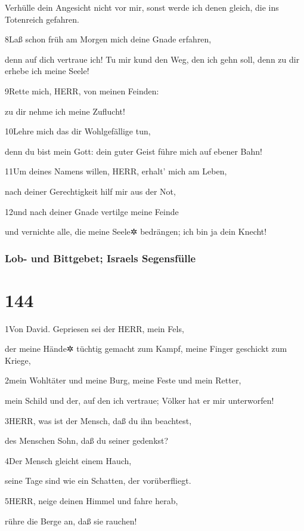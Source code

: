 Verhülle dein Angesicht nicht vor mir, sonst werde ich denen gleich, die
ins Totenreich gefahren.

8Laß schon früh am Morgen mich deine Gnade erfahren,

denn auf dich vertraue ich! Tu mir kund den Weg, den ich gehn soll, denn
zu dir erhebe ich meine Seele!

9Rette mich, HERR, von meinen Feinden:

zu dir nehme ich meine Zuflucht!

10Lehre mich das dir Wohlgefällige tun,

denn du bist mein Gott: dein guter Geist führe mich auf ebener Bahn!

11Um deines Namens willen, HERR, erhalt' mich am Leben,

nach deiner Gerechtigkeit hilf mir aus der Not,

12und nach deiner Gnade vertilge meine Feinde

und vernichte alle, die meine Seele✲ bedrängen; ich bin ja dein Knecht!

\hypertarget{lob--und-bittgebet-israels-segensfuxfclle}{%
\subsubsection{Lob- und Bittgebet; Israels
Segensfülle}\label{lob--und-bittgebet-israels-segensfuxfclle}}

\hypertarget{section-143}{%
\section{144}\label{section-143}}

1Von David. Gepriesen sei der HERR, mein Fels,

der meine Hände✲ tüchtig gemacht zum Kampf, meine Finger geschickt zum
Kriege,

2mein Wohltäter und meine Burg, meine Feste und mein Retter,

mein Schild und der, auf den ich vertraue; Völker hat er mir
unterworfen!

3HERR, was ist der Mensch, daß du ihn beachtest,

des Menschen Sohn, daß du seiner gedenkst?

4Der Mensch gleicht einem Hauch,

seine Tage sind wie ein Schatten, der vorüberfliegt.

5HERR, neige deinen Himmel und fahre herab,

rühre die Berge an, daß sie rauchen!

